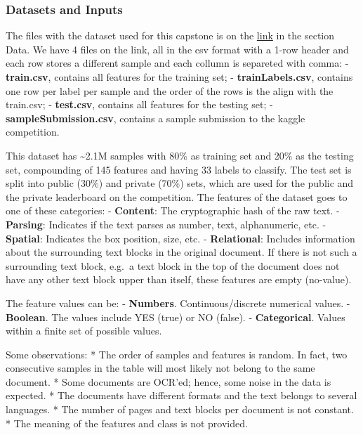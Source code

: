\documentclass[11pt]{article}
\begin{document}
    \hypertarget{datasets-and-inputs}{%
\subsubsection{Datasets and Inputs}\label{datasets-and-inputs}}

The files with the dataset used for this capstone is on the
\href{https://www.kaggle.com/c/tradeshift-text-classification}{link} in
the section Data. We have 4 files on the link, all in the csv format
with a 1-row header and each row stores a different sample and each
collumn is separeted with comma: - \textbf{train.csv}, contains all
features for the training set; - \textbf{trainLabels.csv}, contains one
row per label per sample and the order of the rows is the align with the
train.csv; - \textbf{test.csv}, contains all features for the testing
set; - \textbf{sampleSubmission.csv}, contains a sample submission to
the kaggle competition.

This dataset has \textasciitilde{}2.1M samples with 80\% as training set
and 20\% as the testing set, compounding of 145 features and having 33
labels to classify. The test set is split into public (30\%) and private
(70\%) sets, which are used for the public and the private leaderboard
on the competition. The features of the dataset goes to one of these
categories: - \textbf{Content}: The cryptographic hash of the raw text.
- \textbf{Parsing}: Indicates if the text parses as number, text,
alphanumeric, etc. - \textbf{Spatial}: Indicates the box position, size,
etc. - \textbf{Relational}: Includes information about the surrounding
text blocks in the original document. If there is not such a surrounding
text block, e.g.~a text block in the top of the document does not have
any other text block upper than itself, these features are empty
(no-value).

The feature values can be: - \textbf{Numbers}. Continuous/discrete
numerical values. - \textbf{Boolean}. The values include YES (true) or
NO (false). - \textbf{Categorical}. Values within a finite set of
possible values.

Some observations: * The order of samples and features is random. In
fact, two consecutive samples in the table will most likely not belong
to the same document. * Some documents are OCR'ed; hence, some noise in
the data is expected. * The documents have different formats and the
text belongs to several languages. * The number of pages and text blocks
per document is not constant. * The meaning of the features and class is
not provided.
\end{document}
